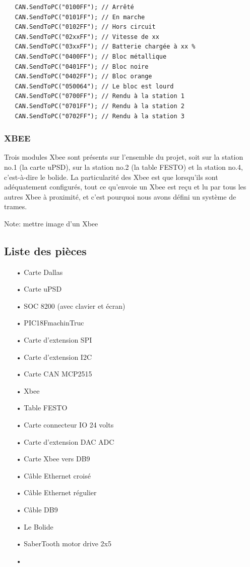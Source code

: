 \documentclass[10pt,a4paper,final]{article}
\begin{document}
\begin{lstlisting}
   CAN.SendToPC("0100FF"); // Arrêté
   CAN.SendToPC("0101FF"); // En marche
   CAN.SendToPC("0102FF"); // Hors circuit
   CAN.SendToPC("02xxFF"); // Vitesse de xx
   CAN.SendToPC("03xxFF"); // Batterie chargée à xx %
   CAN.SendToPC("0400FF"); // Bloc métallique
   CAN.SendToPC("0401FF"); // Bloc noire
   CAN.SendToPC("0402FF"); // Bloc orange
   CAN.SendToPC("050064"); // Le bloc est lourd
   CAN.SendToPC("0700FF"); // Rendu à la station 1
   CAN.SendToPC("0701FF"); // Rendu à la station 2
   CAN.SendToPC("0702FF"); // Rendu à la station 3
\end{lstlisting}
\begin{spacing}{1.5}
\pagebreak

\subsubsection{XBEE}
Trois modules Xbee sont présents sur l'ensemble du projet, soit sur la station no.1 (la carte uPSD), sur la station no.2 (la table FESTO) et la station no.4, c'est-à-dire le bolide. La particularité des Xbee est que lorsqu'ils sont adéquatement configurés, tout ce qu'envoie un Xbee est reçu et lu par tous les autres Xbee à proximité, et c'est pourquoi nous avons défini un système de trames.

Note: mettre image d'un Xbee

\subsection{Liste des pièces}
\begin{center}
\HRule
\end{center}
\begin{multicols}{3}
\begin{itemize}
\item[•]Carte Dallas
\item[•]Carte uPSD
\item[•]SOC 8200 (avec clavier et écran)
\item[•]PIC18FmachinTruc
\item[•]Carte d'extension SPI
\item[•]Carte d'extension I2C
\item[•]Carte CAN MCP2515
\item[•]Xbee
\item[•]Table FESTO
\item[•]Carte connecteur IO 24 volts
\item[•]Carte d'extension DAC ADC
\item[•]Carte Xbee vers DB9
\item[•]Câble Ethernet croisé
\item[•]Câble Ethernet régulier
\item[•]Câble DB9
\item[•]Le Bolide
\item[•]SaberTooth motor drive 2x5
\item[•]
\end{itemize}
\end{multicols}
\begin{center}
\HRule
\end{center}


\end{spacing}
\end{document}
